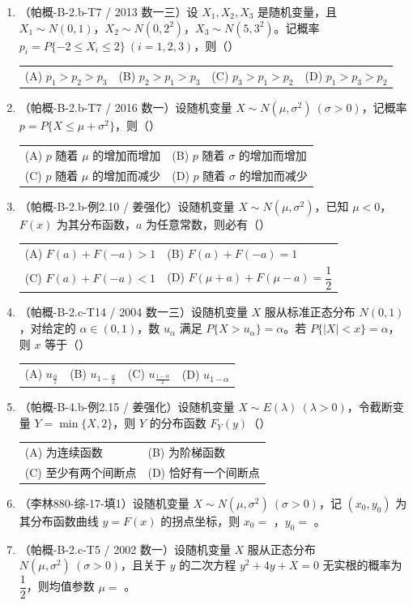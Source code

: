 \documentclass[12pt,a4paper]{ctexart}
\makeatletter
\newcommand{\optfour}[4]{\par\begin{tabularx}{\linewidth}{@{}X@{\quad}X@{\quad}X@{\quad}X@{}}#1&#2&#3&#4\end{tabularx}}
\newcommand{\opttwo}[4]{\par\begin{tabularx}{\linewidth}{@{}X@{\quad}X@{}}#1&#2\\#3&#4\end{tabularx}}
\makeatother
\begin{document}
\begin{enumerate}[label=\arabic*.]
\item（帕概-B-2.b-T7 / 2013 数一三）设 $X_{1}, X_{2}, X_{3}$ 是随机变量，且 $X_{1} \sim N(0, 1)$，$X_{2} \sim N(0, 2^{2})$，$X_{3} \sim N(5, 3^{2})$。记概率 $p_{i} = P\{-2 \leqslant X_{i} \leqslant 2\}\ (i = 1, 2, 3)$，则（\quad）
\optfour{(A) $p_{1} > p_{2} > p_{3}$}{(B) $p_{2} > p_{1} > p_{3}$}{(C) $p_{3} > p_{1} > p_{2}$}{(D) $p_{1} > p_{3} > p_{2}$}

\item（帕概-B-2.b-T7 / 2016 数一）设随机变量 $X \sim N(\mu, \sigma^{2})\ (\sigma > 0)$，记概率 $p = P\{X \leqslant \mu + \sigma^{2}\}$，则（\quad）
\opttwo{(A) $p$ 随着 $\mu$ 的增加而增加}{(B) $p$ 随着 $\sigma$ 的增加而增加}{(C) $p$ 随着 $\mu$ 的增加而减少}{(D) $p$ 随着 $\sigma$ 的增加而减少}

\item（帕概-B-2.b-例2.10 / 姜强化）设随机变量 $X \sim N(\mu, \sigma^{2})$，已知 $\mu < 0$，$F(x)$ 为其分布函数，$a$ 为任意常数，则必有（\quad）
\opttwo{(A) $F(a) + F(-a) > 1$}{(B) $F(a) + F(-a) = 1$}{(C) $F(a) + F(-a) < 1$}{(D) $F(\mu + a) + F(\mu - a) = \dfrac{1}{2}$}

\item（帕概-B-2.c-T14 / 2004 数一三）设随机变量 $X$ 服从标准正态分布 $N(0, 1)$，对给定的 $\alpha \in (0, 1)$，数 $u_{\alpha}$ 满足 $P\{X > u_{\alpha}\} = \alpha$。若 $P\{|X| < x\} = \alpha$，则 $x$ 等于（\quad）
\optfour{(A) $u_{\frac{\alpha}{2}}$}{(B) $u_{1 - \frac{\alpha}{2}}$}{(C) $u_{\frac{1-\alpha}{2}}$}{(D) $u_{1 - \alpha}$}

\item（帕概-B-4.b-例2.15 / 姜强化）设随机变量 $X \sim E(\lambda)\ (\lambda > 0)$，令截断变量 $Y = \min\{X, 2\}$，则 $Y$ 的分布函数 $F_{Y}(y)$（\quad）
\opttwo{(A) 为连续函数}{(B) 为阶梯函数}{(C) 至少有两个间断点}{(D) 恰好有一个间断点}

\item（李林880-综-17-填1）设随机变量 $X \sim N(\mu, \sigma^{2})\ (\sigma > 0)$，记 $(x_{0}, y_{0})$ 为其分布函数曲线 $y = F(x)$ 的拐点坐标，则 $x_{0} = $ \underline{\hspace{5em}}，$y_{0} = $ \underline{\hspace{5em}}。

\item（帕概-B-2.c-T5 / 2002 数一）设随机变量 $X$ 服从正态分布 $N(\mu, \sigma^{2})\ (\sigma > 0)$，且关于 $y$ 的二次方程 $y^{2} + 4y + X = 0$ 无实根的概率为 $\dfrac{1}{2}$，则均值参数 $\mu = $ \underline{\hspace{5em}}。


\end{enumerate}
\end{document}
